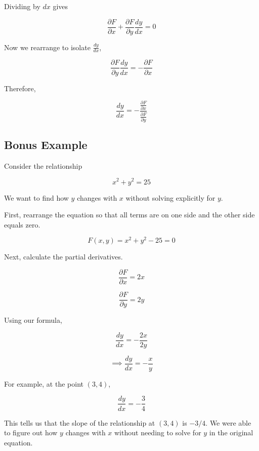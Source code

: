 \documentclass[12pt]{article}
\begin{document}
Dividing by $dx$ gives

\[
\frac{\partial F}{\partial x}
+
\frac{\partial F}{\partial y}
\frac{dy}{dx}
=0
\]

Now we rearrange to isolate $\frac{dy}{dx}$,

\[
\frac{\partial F}{\partial y}
\frac{dy}{dx}
=
-\frac{\partial F}{\partial x}
\]

Therefore,

\[
\frac{dy}{dx}
=
-\frac{
\frac{\partial F}{\partial x}
}{
\frac{\partial F}{\partial y}
}
\]

\subsection{Bonus Example}

Consider the relationship

\[
x^2+y^2=25
\]

We want to find how $y$ changes with $x$ without
solving explicitly for $y$.

First, rearrange the equation so that all terms are on one side and the other side equals zero.

\[
F(x,y)=x^2+y^2-25=0
\]

Next, calculate the partial derivatives.

\[
\frac{\partial F}{\partial x} =2x
\]

\[
\frac{\partial F}{\partial y}=2y
\]

Using our formula,

\[
\frac{dy}{dx}=-\frac{2x}{2y}
\]

\[
\implies \frac{dy}{dx}=-\frac{x}{y}
\]

For example, at the point $(3,4)$,

\[
\frac{dy}{dx}=-\frac{3}{4}
\]

This tells us that the slope of the relationship
at $(3,4)$ is $-3/4$. We were able to figure out how $y$ changes with $x$ without needing to solve for $y$ in the original equation.
\end{document}
